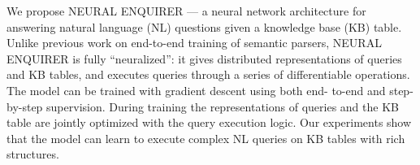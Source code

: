 We propose NEURAL ENQUIRER — a neural network architecture for answering natural language (NL) questions given a knowledge base (KB) table. Unlike previous work on end-to-end training of semantic parsers, NEURAL ENQUIRER is fully ``neuralized'': it gives distributed representations of queries and KB tables, and executes queries through a series of differentiable operations. The model can be trained with gradient descent using both end- to-end and step-by-step supervision. During training the representations of queries and the KB table are jointly optimized with the query execution logic. Our experiments show that the model can learn to execute complex NL queries on KB tables with rich structures.
